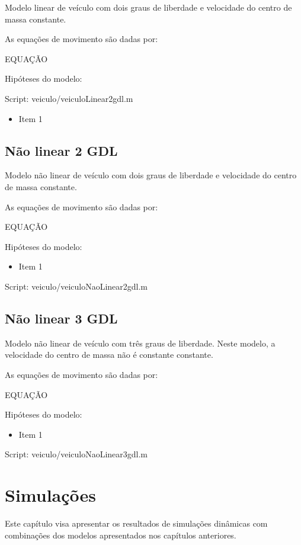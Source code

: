 \documentclass[sublist]{fei}
\begin{document}
Modelo linear de veículo com dois graus de liberdade e velocidade do centro de massa constante.

As equações de movimento são dadas por:

EQUAÇÃO

Hipóteses do modelo:


Script: veiculo/veiculoLinear2gdl.m

\begin{itemize}
\item Item 1
\end{itemize}

\section{Não linear 2 GDL}

Modelo não linear de veículo com dois graus de liberdade e velocidade do centro de massa constante.

As equações de movimento são dadas por:

EQUAÇÃO

Hipóteses do modelo:

\begin{itemize}
\item Item 1
\end{itemize}



Script: veiculo/veiculoNaoLinear2gdl.m


\section{Não linear 3 GDL}


Modelo não linear de veículo com três graus de liberdade. Neste modelo, a velocidade do centro de massa não é constante constante.

As equações de movimento são dadas por:

EQUAÇÃO

Hipóteses do modelo:

\begin{itemize}
\item Item 1
\end{itemize}

Script: veiculo/veiculoNaoLinear3gdl.m

\chapter{Simulações}

Este capítulo visa apresentar os resultados de simulações dinâmicas com combinações dos modelos apresentados nos capítulos anteriores.
\end{document}

